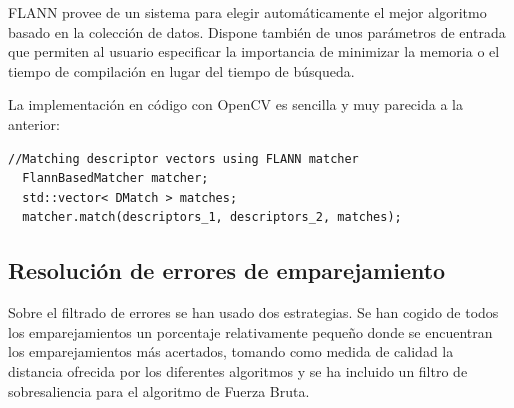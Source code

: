 FLANN provee de un sistema para elegir automáticamente el mejor algoritmo basado en la colección de datos. Dispone también de unos parámetros de entrada que permiten al usuario especificar la importancia de minimizar la memoria o el tiempo de compilación en lugar del tiempo de búsqueda.

La implementación en código con OpenCV es sencilla y muy parecida a la anterior:

\begin{lstlisting}[style=CStyle]
  //Matching descriptor vectors using FLANN matcher
  FlannBasedMatcher matcher;
  std::vector< DMatch > matches;
  matcher.match(descriptors_1, descriptors_2, matches);
\end{lstlisting}
\subsection{Resolución de errores de emparejamiento}

Sobre el filtrado de errores se han usado dos estrategias. Se han cogido de todos los emparejamientos un porcentaje relativamente pequeño donde se encuentran los emparejamientos más acertados, tomando como medida de calidad la distancia ofrecida por los diferentes algoritmos y se ha incluido un filtro de sobresaliencia para el algoritmo de Fuerza Bruta.



